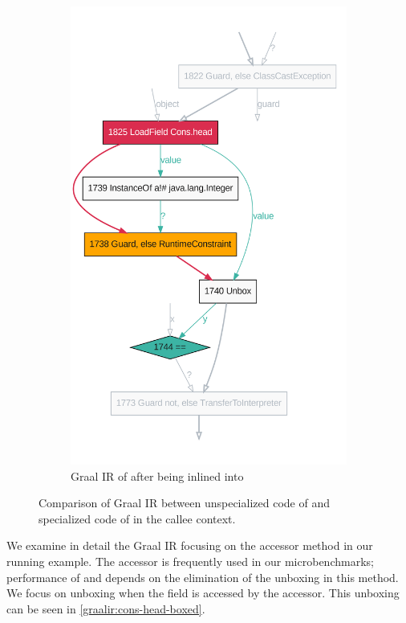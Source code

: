 \begin{figure}[!htb]
\begin{subfigure}[b]{0.45\textwidth}
		\includegraphics[width=\textwidth]{figures/dot/List.contains.boxed.TruffleTier.png}
		\caption{Graal IR of  after being inlined into }
		\label{graalir:cons-contains-head-focus-boxed}
	\end{subfigure}
	\hfill
	\caption{Comparison of Graal IR between unspecialized code of  and specialized code of  in the callee context.}
\end{figure}

We examine in detail the Graal IR focusing on the  accessor method in our  running example.
The accessor is frequently used in our  microbenchmarks; performance of  and  depends on the elimination of the unboxing in this method.
We focus on unboxing when the  field is accessed by the  accessor.
This unboxing can be seen in \ref{graalir:cons-head-boxed}.

